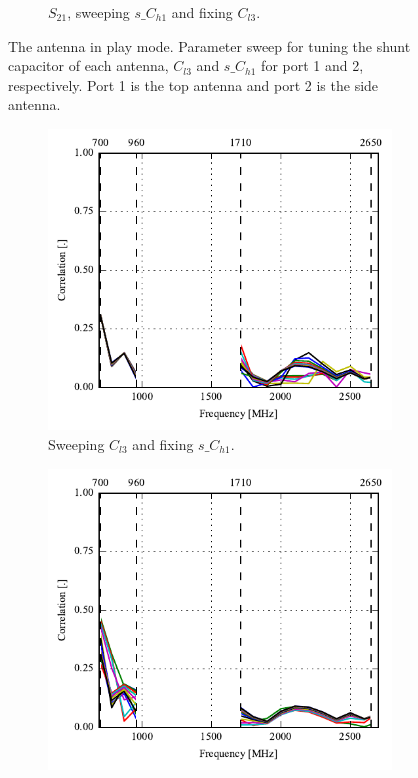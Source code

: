 \begin{figure}[htbp]
\begin{subfigure}[b]{0.49\linewidth}
        \caption{$S_{21}$, sweeping $s\_C_{h1}$ and fixing $C_{l3}$.}
    \end{subfigure}
    \caption{The antenna in play mode. Parameter sweep for tuning the shunt capacitor of each antenna, $C_{l3}$ and $s\_C_{h1}$ for port 1 and 2, respectively. Port 1 is the top antenna and port 2 is the side antenna.}
    \label{fig:ant3_sparam_sweep_play}
\end{figure}

\begin{figure}[htbp]
    \centering
    \begin{subfigure}{0.49\linewidth}
        \includegraphics{img/tech_sol/nonresonant/simulation/play_mode/sweep_top_corr}
        \caption{Sweeping $C_{l3}$ and fixing $s\_C_{h1}$.}
    \end{subfigure}
    \hfill
    \begin{subfigure}{0.49\linewidth}
        \includegraphics{img/tech_sol/nonresonant/simulation/play_mode/sweep_side_corr}

\end{subfigure}
\end{figure}
